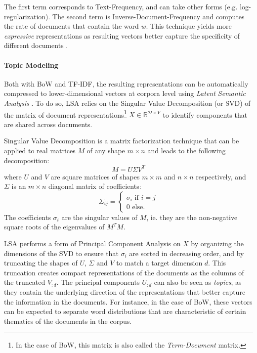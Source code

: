 The first term corresponds to Text-Frequency, and can take other forms (e.g. log-regularization). The second term is Inverse-Document-Frequency and computes the rate of documents that contain the word $w$. This technique yields more \textit{expressive} representations as resulting vectors better capture the specificity of different documents \citep{ramos2003using}.

\paragraph*{Topic Modeling}

Both with BoW and TF-IDF, the resulting representations can be automatically compressed to lower-dimensional vectors at corpora level using \textit{Latent Semantic Analysis} \citep{deerwester1990indexing}. To do so, LSA relies on the Singular Value Decomposition (or SVD) of the matrix of document representations\footnote{In the case of BoW, this matrix is also called the \textit{Term-Document} matrix.} $X \in \mathbb{R}^{\mathcal{D} \times V}$ to identify components that are shared across documents.

Singular Value Decomposition is a matrix factorization technique that can be applied to real matrices $M$ of any shape $m \times n$ and leads to the following decomposition:
$$
M = U \Sigma V^T
$$
where $U$ and $V$ are square matrices of shapes $m \times m$ and $n \times n$ respectively, and $\Sigma$ is an $m \times n$ diagonal matrix of coefficients:
\begin{equation*}
  \Sigma_{ij} = \begin{cases}
    \sigma_i \text{ if } i=j \\
    0 \text{ else.}
  \end{cases}
\end{equation*}
The coefficients $\sigma_i$ are the singular values of $M$, ie. they are the non-negative square roots of the eigenvalues of $M^TM$.

LSA performs a form of Principal Component Analysis on $X$ by organizing the dimensions of the SVD to ensure that $\sigma_i$ are sorted in decreasing order, and by truncating the shapes of $U$, $\Sigma$ and $V$ to match a target dimension $d$. This truncation creates compact representations of the documents as the columns of the truncated $V_{:d}$. The principal components $U_{:d}$ can also be seen as \textit{topics}, as they contain the underlying direction of the representations that better capture the information in the documents. For instance, in the case of BoW, these vectors can be expected to separate word distributions that are characteristic of certain thematics of the documents in the corpus.


